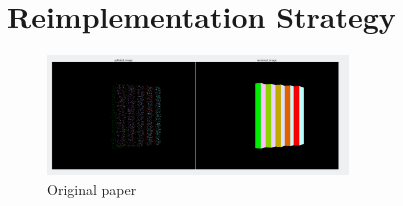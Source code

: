 \section{Reimplementation Strategy}
\label{sec:remplementation}
\begin{figure}[H]
    \centering
    \includegraphics[width=8cm]{figures/normal_culling.png}
    \caption{Original paper}
    \label{fig:original_model_overview}
\end{figure}